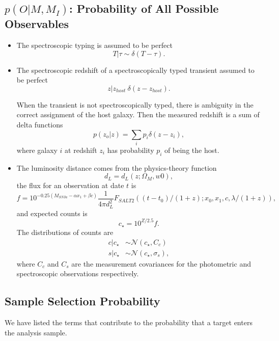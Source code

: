 \documentclass[preprint,3p]{elsarticle}
\begin{document}
\subsection{$p(O| M, M_I)$: Probability of All Possible Observables}
\begin{itemize}
\item The spectroscopic typing is assumed to be perfect
\begin{equation}
T | \tau \sim \delta (T-\tau).
\label{typepdf:eqn}
\end{equation}

\item The spectroscopic redshift of a spectroscopically typed transient assumed to be perfect
\begin{equation}
z | z_{host} ~ \delta (z-z_{host}).
\end{equation}

When the transient is not spectroscopically typed, there is ambiguity in the correct assignment of the host galaxy.
Then the measured redshift is a sum of delta functions
\begin{equation}
p(z_o|z) = \sum_i p_i \delta(z-z_i),
\end{equation}
where galaxy $i$ at
redshift $z_i$ has probability $p_i$ of being
the host.  

\item  The luminosity distance comes from the physics-theory function
\begin{equation}
d_L = d_L(z; \Omega_M, w0),
\end{equation}
the flux for an observation at date $t$ is
\begin{equation}
f = 10^{-0.25 \left(M_{SNIa} - \alpha x_1 + \beta c \right)}\frac{1}{4\pi d_L^2} F_{SALT2}((t-t_0)/(1+z); x_0,  x_1, c, \lambda/(1+z)),
\end{equation}
and expected counts is
\begin{equation}
c_\star = 10^{Z/2.5}f.
\end{equation}
The distributions of counts are 
\begin{align*}
c | c_\star &\sim \mathcal{N}(c_\star, C_c)\\
s | c_\star &\sim \mathcal{N}(c_\star, \sigma_s),
\end{align*}
where $C_c$ and $C_s$ are the measurement covariances for the photometric and spectroscopic observations respectively.

\end{itemize}

\subsection{Sample Selection Probability}
We have listed the terms that contribute to the probability that a target enters
the analysis sample.
\end{document}
